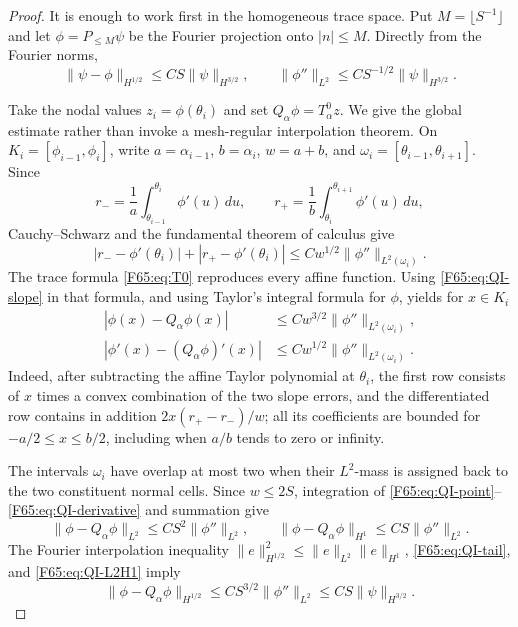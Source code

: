 \begin{proof}
It is enough to work first in the homogeneous trace space.  Put
\(M=\lfloor S^{-1}\rfloor\) and let \(\phi=P_{\le M}\psi\) be the
Fourier projection onto \(|n|\le M\).  Directly from the Fourier norms,
\begin{equation}\label{F65:eq:QI-tail}
 \|\psi-\phi\|_{H^{1/2}}
 \le CS\|\psi\|_{H^{3/2}},
 \qquad
 \|\phi''\|_{L^2}
 \le CS^{-1/2}\|\psi\|_{H^{3/2}}.
\end{equation}

Take the nodal values \(z_i=\phi(\theta_i)\) and set
\(Q_\alpha\phi=T_\alpha^0z\).  We give the global estimate rather than
invoke a mesh-regular interpolation theorem.  On
\(K_i=[\phi_{i-1},\phi_i]\), write
\(a=\alpha_{i-1}\), \(b=\alpha_i\), \(w=a+b\), and
\(\omega_i=[\theta_{i-1},\theta_{i+1}]\).  Since
\begin{equation*}
 r_-=\frac1a\int_{\theta_{i-1}}^{\theta_i}\phi'(u)\,du,
 \qquad
 r_+=\frac1b\int_{\theta_i}^{\theta_{i+1}}\phi'(u)\,du,
\end{equation*}
Cauchy--Schwarz and the fundamental theorem of calculus give
\begin{equation}\label{F65:eq:QI-slope}
 |r_--\phi'(\theta_i)|+|r_+-\phi'(\theta_i)|
 \le Cw^{1/2}\|\phi''\|_{L^2(\omega_i)}.
\end{equation}
The trace formula \eqref{F65:eq:T0} reproduces every affine function.  Using
\eqref{F65:eq:QI-slope} in that formula, and using Taylor's integral formula
for \(\phi\), yields for \(x\in K_i\)
\begin{align}
 |\phi(x)-Q_\alpha\phi(x)|
 &\le Cw^{3/2}\|\phi''\|_{L^2(\omega_i)},\label{F65:eq:QI-point}\\
 |\phi'(x)-(Q_\alpha\phi)'(x)|
 &\le Cw^{1/2}\|\phi''\|_{L^2(\omega_i)}.\label{F65:eq:QI-derivative}
\end{align}
Indeed, after subtracting the affine Taylor polynomial at \(\theta_i\),
the first row consists of \(x\) times a convex combination of the two
slope errors, and the differentiated row contains in addition
\(2x(r_+-r_-)/w\); all its coefficients are bounded for
\(-a/2\le x\le b/2\), including when \(a/b\) tends to zero or infinity.

The intervals \(\omega_i\) have overlap at most two when their
\(L^2\)-mass is assigned back to the two constituent normal cells.
Since \(w\le2S\), integration of
\eqref{F65:eq:QI-point}--\eqref{F65:eq:QI-derivative} and summation give
\begin{equation}\label{F65:eq:QI-L2H1}
 \|\phi-Q_\alpha\phi\|_{L^2}
 \le CS^2\|\phi''\|_{L^2},
 \qquad
 \|\phi-Q_\alpha\phi\|_{H^1}
 \le CS\|\phi''\|_{L^2}.
\end{equation}
The Fourier interpolation inequality
\(\|e\|_{H^{1/2}}^2\le\|e\|_{L^2}\|e\|_{H^1}\),
\eqref{F65:eq:QI-tail}, and \eqref{F65:eq:QI-L2H1} imply
\begin{equation}\label{F65:eq:QI-homogeneous}
 \|\phi-Q_\alpha\phi\|_{H^{1/2}}
 \le CS^{3/2}\|\phi''\|_{L^2}
 \le CS\|\psi\|_{H^{3/2}}.
\end{equation}


\end{proof}
